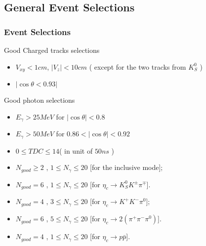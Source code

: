 \documentclass{beamer}
\begin{document}
\subsection{General Event Selections}
\begin{frame}
  \frametitle{Event Selections}
  \begin{block}{Good Charged tracks selections}
    \begin{itemize}
      \item $V_{xy} < 1 cm$, $ | V_z | < 10 cm$ ( except for the two tracks from $K_S^0$ )
      \item $|\cos\theta < 0.93 |$
    \end{itemize}
  \end{block}
  \begin{block}{Good photon selections}
    \begin{itemize}
      \item $E_{\gamma} > 25 MeV$ for $|\cos\theta| < 0.8$
      \item $E_{\gamma} > 50 MeV$ for $0.86<|\cos\theta|<0.92$
      \item $0\leq TDC\leq 14 $( in unit of $50ns$ )
    \end{itemize}
  \end{block}
  \begin{block}{}
    \begin{itemize}
      \item $N_{good}\ge 2$ ,  $1\leq N_{\gamma}\leq 20$ [for the inclusive mode];
      \item $N_{good} = 6$ ,  $1\le N_{\gamma}\le 20 $  [for $\eta_c\to K^0_S K^{\pm}\pi^{\mp}$].
      \item $N_{good} = 4$ ,  $3\leq N_{\gamma}\leq 20$ [for $\eta_c\to K^+K^-\pi^0$];
      \item $N_{good} = 6$ ,  $5\le N_{\gamma}\le 20 $  [for $\eta_c\to 2(\pi^+\pi^-\pi^0)$].
      \item $N_{good} = 4$ ,  $1\le N_{\gamma}\le 20 $  [for $\eta_c\to p \bar{p}$].
    \end{itemize}
  \end{block}
  \bigskip
\end{frame}
\end{document}
